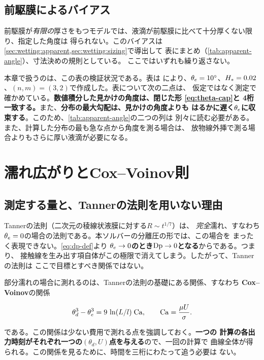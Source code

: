 \subsection{前駆膜によるバイアス}

前駆膜が\emph{有限の}厚さをもつモデルでは、液滴が前駆膜に比べて十分厚くない限り、指定した角度は
得られない。このバイアスは\cref{sec:wetting:apparent,sec:wetting:sizing}で導出して
表にまとめ（\cref{tab:apparent-angle}）、寸法決めの規則としている。
ここではいずれも繰り返さない。

本章で扱うのは、この表の検証状況である。表は
により、$\theta_{e} = 10^\circ$、$H_{*} = 0.02$、$(n,m) = (3,2)$で作成した。表について次の二点は、
仮定ではなく測定で確かめている。\textbf{数値積分した見かけの角度は、閉じた形
\cref{eq:theta-cap}と 4桁一致する。}また、\textbf{分布の最大勾配は、見かけの角度よりも
はるかに遅く$\theta_{e}$に収束する}。このため、\cref{tab:apparent-angle}の二つの列は
別々に読む必要がある。また、計算した分布の最も急な点から角度を測る場合は、
放物線外挿で測る場合よりもさらに厚い液滴が必要になる。

\section{濡れ広がりとCox--Voinov則}
\label{sec:verification:spreading}

\subsection{測定する量と、Tannerの法則を用いない理由}

Tannerの法則（二次元の稜線状液膜に対する$R \sim t^{1/7}$）は、
\emph{完全}濡れ、すなわち$\theta_{e} = 0$の場合の法則である。本ソルバーの分離圧の形では、この場合を
まったく表現できない。\cref{eq:dp-def}より
\textbf{$\theta_{e} \to 0$のとき$\mathrm{Dp} \to 0$となる}からである。つまり、
接触線を生み出す項自体がこの極限で消えてしまう。したがって、Tannerの法則は
ここで目標とすべき関係ではない。

部分濡れの場合に測れるのは、Tannerの法則の基礎にある関係、すなわち
\textbf{Cox--Voinov}の関係

\begin{equation}\label{eq:cox-voinov}
  \theta_d^{3} - \theta_{e}^{3} = 9\,\ln(L/l)\;\mathrm{Ca},
  \qquad \mathrm{Ca} = \frac{\mu U}{\sigma}.
\end{equation}

である。この関係は少ない費用で測れる点を強調しておく。\textbf{一つの
計算の各出力時刻がそれぞれ一つの$(\theta_d, U)$点を与える}ので、一回の計算で
曲線全体が得られる。この関係を見るために、時間を三桁にわたって追う必要は
ない。

